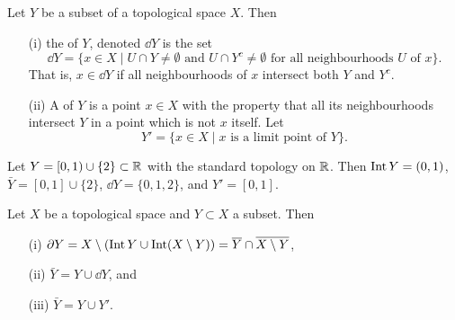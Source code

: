 \begin{defn}
  Let $Y$ be a subset of a topological space $X$. Then
  \begin{enumerate}
    \item[(i)] the  of $Y$, denoted $\dd Y$ is the set
      \[
        \dd Y = \{ x \in X \mid \text{$U \cap Y \not= \emptyset$ and $U \cap Y^c \not= \emptyset$ for all neighbourhoods $U$ of $x$}\}.
      \]
      That is, $x \in \dd Y$ if all neighbourhoods of $x$ intersect both $Y$ and $Y^c$.
    \item[(ii)] A  of $Y$ is a point $x \in X$ with the property that all its neighbourhoods intersect $Y$ in a point which is not $x$ itself. Let
    \[
      Y' = \{x \in X \mid \text{$x$ is a limit point of $Y$} \}.
    \]
  \end{enumerate}
\end{defn}
\begin{example}
  Let $Y = [0,1) \cup \{2\} \subset \mathbb{R}$ with the standard topology on $\mathbb{R}$. Then $\operatorname{Int} Y = (0,1)$, $\bar{Y} = [0,1] \cup \{2\}$, $\dd Y = \{0,1,2\}$, and $Y' = [0,1]$.
\end{example}
\begin{thm}
  \label{relations-closure-boundary}
  Let $X$ be a topological space and $Y \subset X$ a subset. Then
  \begin{enumerate}
    \item[(i)]  $\partial Y = X \setminus (\operatorname{Int} Y \cup \operatorname{Int} (X \setminus Y)) = \overline Y \cap \overline{X \setminus Y}$,
    \item[(ii)] $\bar{Y} = Y \cup \dd Y$, and
    \item[(iii)] $\bar{Y} = Y \cup Y'$.
  \end{enumerate}
\end{thm}
